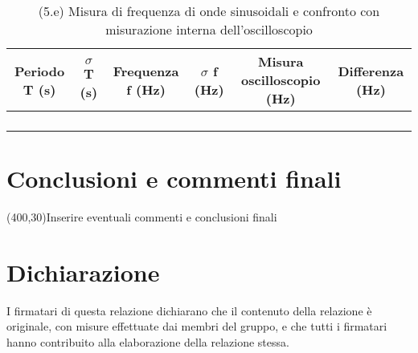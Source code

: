 \documentclass[10pt,a4paper]{article}
\newcommand{\exn}{\phantom{xxx}}
\begin{document}
\begin{table}[h]
\centering
\begin{tabular}{|c|c|c|c|c|c|}
\hline 
Periodo T (s)& $\sigma$ T (s)  &Frequenza f (Hz) & $\sigma$ f (Hz) & Misura oscilloscopio (Hz) & Differenza (Hz)\\
\hline 
\exn & \exn & \exn & \exn & \exn &\exn \\
\exn & \exn & \exn & \exn & \exn &\exn \\
\exn & \exn & \exn & \exn & \exn &\exn \\
\exn & \exn & \exn & \exn & \exn &\exn \\
\hline 
\end{tabular} 
\caption{(5.e) Misura di frequenza di onde sinusoidali  e confronto con misurazione interna dell'oscilloscopio }
\end{table}


\section{Conclusioni e commenti finali}
\framebox(400,30){Inserire eventuali commenti e conclusioni finali}

\section*{Dichiarazione}
I firmatari di questa relazione dichiarano che il contenuto della relazione \`e originale, con misure effettuate dai membri del gruppo, e che tutti i firmatari hanno contribuito alla elaborazione della relazione stessa.
\end{document}

